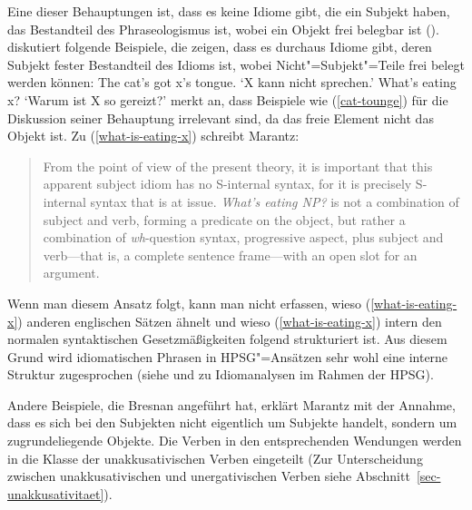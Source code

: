%
Eine dieser Behauptungen ist, dass es keine Idiome gibt, die ein Subjekt haben, das Bestandteil des
Phraseologismus ist, wobei ein Objekt frei belegbar ist (\citealp[--51]{Marantz81a-u}).
\citet[--350]{Bresnan82c} diskutiert folgende Beispiele, die zeigen, dass es durchaus
Idiome gibt, deren Subjekt fester Bestandteil des Idioms ist, wobei Nicht"=Subjekt"=Teile
frei belegt werden können:
\eal
\ex\label{cat-tounge}
The cat's got x's tongue.
\glt `X kann nicht sprechen.'
\ex\label{what-is-eating-x}
What's eating x?
\glt `Warum ist X so gereizt?'
\zl
\citet[]{Marantz84a} merkt an, dass Beispiele wie (\ref{cat-tounge}) für die Diskussion seiner
Behauptung irrelevant sind, da das freie Element nicht das Objekt ist. Zu (\ref{what-is-eating-x}) schreibt
Marantz:
\begin{quote}
From the point of view of the present theory, it is important that this apparent subject idiom
has no S-internal syntax, for it is precisely S-internal syntax that is at issue. \emph{What's eating NP?}
is not a combination of subject and verb, forming a predicate on the object, but rather a combination of \emph{wh}-question
syntax, progressive aspect, plus subject and verb---that is, a complete sentence frame---with an open slot
for an argument. \citep[]{Marantz84a}
\end{quote}
Wenn man diesem Ansatz folgt, kann man nicht erfassen, wieso (\ref{what-is-eating-x}) anderen englischen
Sätzen ähnelt und wieso (\ref{what-is-eating-x}) intern den normalen syntaktischen Gesetzmäßigkeiten folgend strukturiert ist.
Aus diesem Grund wird idiomatischen Phrasen in HPSG"=Ansätzen sehr wohl eine interne Struktur zugesprochen 
(siehe  und  zu Idiomanalysen im Rahmen der HPSG). 

Andere Beispiele, die Bresnan angeführt hat, erklärt Marantz mit der Annahme, dass es sich bei
den Subjekten nicht eigentlich um Subjekte handelt, sondern um zugrundeliegende Objekte. Die
Verben in den entsprechenden Wendungen werden in die Klasse der unakkusativischen Verben eingeteilt
(Zur Unterscheidung zwischen unakkusativischen und unergativischen Verben siehe Abschnitt~\ref{sec-unakkusativitaet}).


